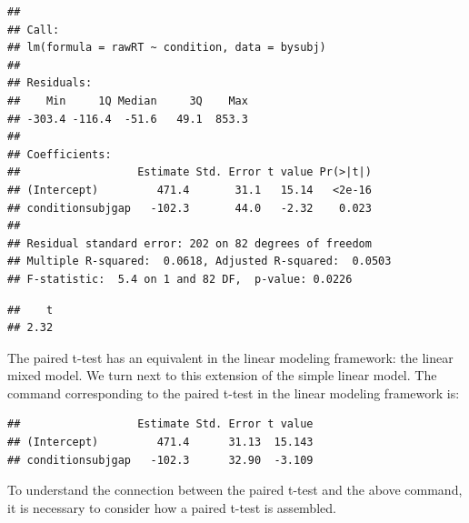 \documentclass[12pt,]{krantz}
\newenvironment{Shaded}{\begin{snugshade}}{\end{snugshade}}
\newcommand{\DataTypeTok}[1]{\textcolor[rgb]{0.13,0.29,0.53}{#1}}
\newcommand{\DecValTok}[1]{\textcolor[rgb]{0.00,0.00,0.81}{#1}}
\newcommand{\KeywordTok}[1]{\textcolor[rgb]{0.13,0.29,0.53}{\textbf{#1}}}
\newcommand{\NormalTok}[1]{#1}
\newcommand{\OperatorTok}[1]{\textcolor[rgb]{0.81,0.36,0.00}{\textbf{#1}}}
\newcommand{\OtherTok}[1]{\textcolor[rgb]{0.56,0.35,0.01}{#1}}
\begin{document}
\begin{verbatim}
## 
## Call:
## lm(formula = rawRT ~ condition, data = bysubj)
## 
## Residuals:
##    Min     1Q Median     3Q    Max 
## -303.4 -116.4  -51.6   49.1  853.3 
## 
## Coefficients:
##                  Estimate Std. Error t value Pr(>|t|)
## (Intercept)         471.4       31.1   15.14   <2e-16
## conditionsubjgap   -102.3       44.0   -2.32    0.023
## 
## Residual standard error: 202 on 82 degrees of freedom
## Multiple R-squared:  0.0618, Adjusted R-squared:  0.0503 
## F-statistic:  5.4 on 1 and 82 DF,  p-value: 0.0226
\end{verbatim}

\begin{Shaded}
\end{Shaded}

\begin{verbatim}
##    t 
## 2.32
\end{verbatim}

The paired t-test has an equivalent in the linear modeling framework: the linear mixed model. We turn next to this extension of the simple linear model. The command corresponding to the paired t-test in the linear modeling framework is:

\begin{Shaded}
\end{Shaded}

\begin{verbatim}
##                  Estimate Std. Error t value
## (Intercept)         471.4      31.13  15.143
## conditionsubjgap   -102.3      32.90  -3.109
\end{verbatim}

To understand the connection between the paired t-test and the above command, it is necessary to consider how a paired t-test is assembled.
\end{document}
